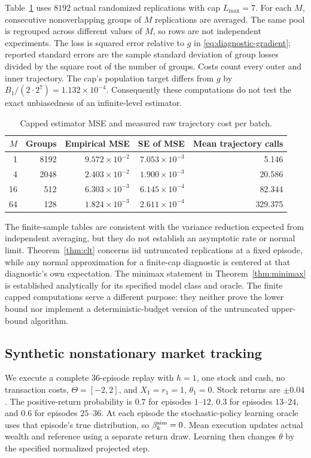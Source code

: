 \documentclass[11pt]{article}
\newcommand{\1}{\mathbf 1}
\begin{document}
Table~\ref{tab:batch-diagnostics} uses $8192$ actual randomized replications with cap $L_{\max}=7$. For each $M$, consecutive nonoverlapping groups of $M$ replications are averaged. The same pool is regrouped across different values of $M$, so rows are not independent experiments. The loss is squared error relative to $g$ in \eqref{eq:diagnostic-gradient}; reported standard errors are the sample standard deviation of group losses divided by the square root of the number of groups. Costs count every outer and inner trajectory. The cap's population target differs from $g$ by $B_1/(2\cdot2^7)=1.132\times10^{-4}$. Consequently these computations do not test the exact unbiasedness of an infinite-level estimator.

\begin{table}[htbp]
\centering\small
\caption{Capped estimator MSE and measured raw trajectory cost per batch.}\label{tab:batch-diagnostics}
\begin{tabular}{rrrrr}
\toprule
$M$ & Groups & Empirical MSE & SE of MSE & Mean trajectory calls\\
\midrule
1 & 8192 & $9.572\times10^{-2}$ & $7.053\times10^{-3}$ & 5.146 \\
4 & 2048 & $2.403\times10^{-2}$ & $1.900\times10^{-3}$ & 20.586 \\
16 & 512 & $6.303\times10^{-3}$ & $6.145\times10^{-4}$ & 82.344 \\
64 & 128 & $1.824\times10^{-3}$ & $2.611\times10^{-4}$ & 329.375 \\
\bottomrule
\end{tabular}
\end{table}

The finite-sample tables are consistent with the variance reduction expected from independent averaging, but they do not establish an asymptotic rate or normal limit. Theorem~\ref{thm:clt} concerns iid untruncated replications at a fixed episode, while any normal approximation for a finite-cap diagnostic is centered at that diagnostic's own expectation. The minimax statement in Theorem~\ref{thm:minimax} is established analytically for its specified model class and oracle. The finite capped computations serve a different purpose: they neither prove the lower bound nor implement a deterministic-budget version of the untruncated upper-bound algorithm.

\subsection{Synthetic nonstationary market tracking}
We execute a complete $36$-episode replay with $h=1$, one stock and cash, no transaction costs, $\Theta=[-2,2]$, and $X_1=r_1=1$, $\theta_1=0$. Stock returns are $\pm0.04$. The positive-return probability is $0.7$ for episodes $1$--$12$, $0.3$ for episodes $13$--$24$, and $0.6$ for episodes $25$--$36$. At each episode the stochastic-policy learning oracle uses that episode's true distribution, so $\beta_k^{\rm sim}=0$. Mean execution updates actual wealth and reference using a separate return draw. Learning then changes $\theta$ by the specified normalized projected step.
\end{document}
